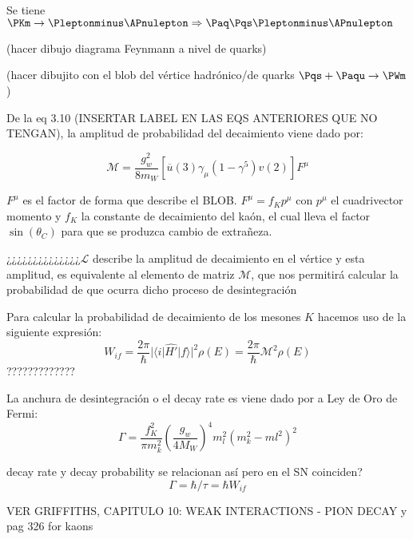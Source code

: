Se tiene $\PKm \rightarrow \Pleptonminus \APnulepton \Rightarrow \Paq\Pqs \Pleptonminus \APnulepton$

(hacer dibujo diagrama Feynmann a nivel de quarks)

(hacer dibujito con el blob del vértice hadrónico/de quarks $\Pqs +\Paqu \rightarrow \PWm$)

De la eq 3.10 (INSERTAR LABEL EN LAS EQS ANTERIORES QUE NO TENGAN), la amplitud de probabilidad del decaimiento viene dado por:

\begin{equation}
\mathcal{M}=\dfrac{g_{w}^{2}}{8m_{W}}\left[ \overline{u}\left( 3\right) \gamma _{\mu }\left( 1-\gamma ^{5}\right) v \left( 2\right) \right] F^{\mu }
\end{equation}

$F^{\mu }$ es el factor de forma que describe el BLOB. $F^{\mu }=f_Kp^{\mu}$ con $p^{\mu}$ el cuadrivector momento y $f_K$ la constante de decaimiento del kaón, el cual lleva el factor $\sin \left(\theta_C \right)$ para que se produzca cambio de extrañeza.

¿¿¿¿¿¿¿¿¿¿¿¿¿¿$\mathcal{L}$ describe la amplitud de decaimiento en el vértice y esta amplitud, es equivalente al elemento de matriz $\mathcal{M}$, que nos permitirá calcular la probabilidad de que ocurra dicho proceso de desintegración

Para calcular la probabilidad de decaimiento de los mesones $K$ hacemos uso de la siguiente expresión:
\begin{equation}
W_{if}= \dfrac{2\pi }{\hbar }\left| \langle i\right| \widehat{H'}| f\rangle| ^{2}\rho \left( E\right) = \dfrac{2\pi }{\hbar } \mathcal{M} ^{2}\rho \left( E\right)
\end{equation}
?????????????

La anchura de desintegración o el decay rate es viene dado por a Ley de Oro de Fermi:
\begin{equation}
\Gamma =\dfrac{f_{K}^{2}}{\pi m_{k}^{2}}\left( \dfrac{g_w}{4M_W}\right) ^{4} m_l^{2}\left( m_{k}^{2}-ml^{2}\right) ^{2}
\end{equation}

decay rate y decay probability se relacionan así pero en el SN coinciden?
\begin{equation}
\Gamma = {\hbar}/{\tau} = \hbar W_{if}
\end{equation}

VER GRIFFITHS, CAPITULO 10: WEAK INTERACTIONS - PION DECAY y pag 326 for kaons
